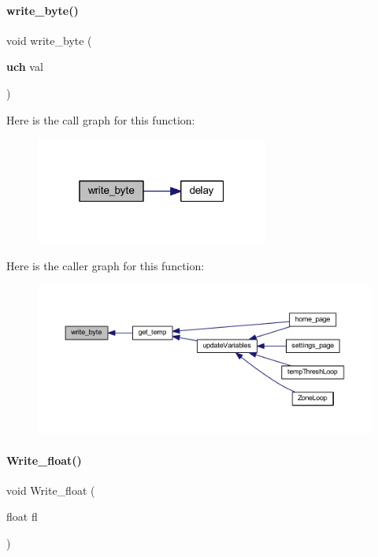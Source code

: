 \mbox{\label{a00050_ae8485e14c60e10731e2a3dcdc723b099}} 
\paragraph{write\+\_\+byte()}
{\footnotesize\ttfamily void write\+\_\+byte (\begin{DoxyParamCaption}\item[{\textbf{ uch}}]{val }\end{DoxyParamCaption})}

Here is the call graph for this function\+:
\nopagebreak
\begin{figure}[H]
\begin{center}
\leavevmode
\includegraphics[width=217pt]{a00050_ae8485e14c60e10731e2a3dcdc723b099_cgraph}
\end{center}
\end{figure}
Here is the caller graph for this function\+:
\nopagebreak
\begin{figure}[H]
\begin{center}
\leavevmode
\includegraphics[width=350pt]{a00050_ae8485e14c60e10731e2a3dcdc723b099_icgraph}
\end{center}
\end{figure}
\mbox{\label{a00050_a5a42eb877b8962ee31a5cadc7130e9e1}} 
\paragraph{Write\+\_\+float()}
{\footnotesize\ttfamily void Write\+\_\+float (\begin{DoxyParamCaption}\item[{float}]{fl }\end{DoxyParamCaption})}

